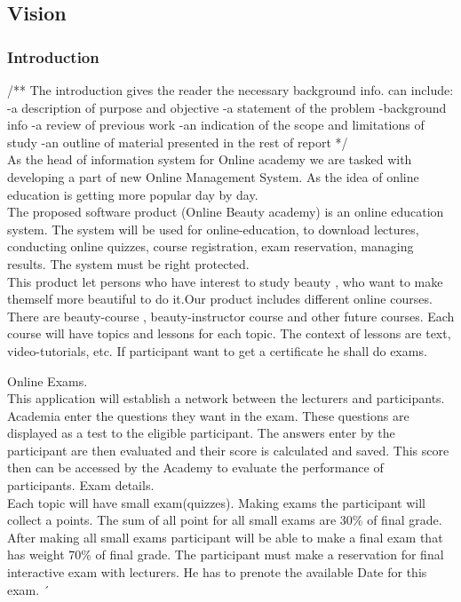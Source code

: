 \documentclass{scrartcl}
\begin{document}
\lipsum[1-8]
\subsection{Vision}

  	\subsubsection{Introduction}
  	/** The introduction gives the reader the necessary background info. can include:
-a description of purpose and objective
-a statement of the problem
-background info
-a review of previous work
-an indication of the scope and limitations of study
-an outline of material presented in the rest of report
*/ \\
As the head of information system for Online academy we are tasked with developing a part of new Online Management System. As the idea of online education is getting more popular day by day. \\
The proposed software product (Online Beauty academy) is an online education system. The system will be used for online-education, to download lectures, conducting online quizzes, course registration, exam reservation, managing results. The system must be right protected.\\
This product let persons who have interest to study beauty , who want to make themself more beautiful to do it.Our product includes different online courses. There are  beauty-course , beauty-instructor course and other future courses.
 Each course will have topics and lessons for each topic. The context of lessons are text, video-tutorials, etc. 
 If participant want to get a certificate he shall do exams. 

Online Exams.\\
 This application will establish a network between the lecturers and participants. Academia enter the questions they want in the exam. These questions are displayed as a test to the eligible participant. The answers enter by the participant are then evaluated and their score is calculated and saved. This score then can be accessed by the Academy to evaluate the performance of participants.
Exam details.\\
Each topic will have small exam(quizzes). Making exams the participant will collect a points. The sum of all point for all small exams are 30\% of final grade. After making all small exams participant will be able to make a final exam that has weight 70\% of final grade. The participant must make a reservation for final interactive exam with lecturers. He has to prenote the available Date for this exam. ´\\
\end{document}
